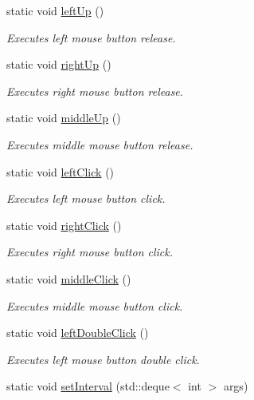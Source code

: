 \begin{DoxyCompactItemize}
static void \hyperlink{class_lua_api_engine_a926f72169c400bb32186737f03208e1c}{left\-Up} ()
\begin{DoxyCompactList}\small\item\em Executes left mouse button release. \end{DoxyCompactList}\item 
static void \hyperlink{class_lua_api_engine_ae8b09733792cc95ca22654be8074bfbf}{right\-Up} ()
\begin{DoxyCompactList}\small\item\em Executes right mouse button release. \end{DoxyCompactList}\item 
static void \hyperlink{class_lua_api_engine_a2cd4a53a99e262aa9d5e83a2b34b6538}{middle\-Up} ()
\begin{DoxyCompactList}\small\item\em Executes middle mouse button release. \end{DoxyCompactList}\item 
static void \hyperlink{class_lua_api_engine_ae857b39d951f50a206989c3422cb5494}{left\-Click} ()
\begin{DoxyCompactList}\small\item\em Executes left mouse button click. \end{DoxyCompactList}\item 
static void \hyperlink{class_lua_api_engine_a7b3664b6f2593d3bd817edeee61a18e6}{right\-Click} ()
\begin{DoxyCompactList}\small\item\em Executes right mouse button click. \end{DoxyCompactList}\item 
static void \hyperlink{class_lua_api_engine_a633c229323434db2d1af7f66c1517a34}{middle\-Click} ()
\begin{DoxyCompactList}\small\item\em Executes middle mouse button click. \end{DoxyCompactList}\item 
static void \hyperlink{class_lua_api_engine_a2004f3ce56fc785e0276491642e39e7a}{left\-Double\-Click} ()
\begin{DoxyCompactList}\small\item\em Executes left mouse button double click. \end{DoxyCompactList}\item 
static void \hyperlink{class_lua_api_engine_a1fd7ea4ba6fe3a396cd1dfff02db1a7c}{set\-Interval} (std\-::deque$<$ int $>$ args)

\end{DoxyCompactItemize}
